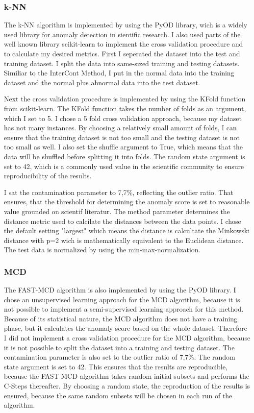 
\subsubsection*{k-NN}
The k-NN algorithm is implemented by using the PyOD library, wich is a widely used library for anomaly detection in sientific research.
I also used parts of the well known library scikit-learn to implement the cross validation procedure and to calculate my desired metrics.
First I seperated the dataset into the test and training dataset.
I split the data into same-sized training and testing datasets.
Similiar to the InterCont Method, I put in the normal data into the training dataset and the normal plus abnormal data into the test dataset.


Next the cross validation procedure is implemented by using the KFold function from scikit-learn.
The KFold function takes the number of folds as an argument, which I set to 5.
I chose a 5 fold cross validation approach, because my dataset has not many instances. 
By choosing a relatively small amount of folds, I can ensure that the training dataset is not too small and the testing dataset is not too small as well.
I also set the shuffle argument to True, which means that the data will be shuffled before splitting it into folds.
The random state argument is set to 42, which is a commonly used value in the scientific community to ensure reproducibility of the results.


I sat the contamination parameter to 7,7\%, reflecting the outlier ratio.
That ensures, that the threshold for determining the anomaly score is set to reasonable value grounded on scientif literatur.
The  method parameter determines the distance metric used to calcilate the distances between the data points.
I chose the default setting "largest" which means the distance is calcultate the Minkowski distance with p=2 wich is mathematically equivalent to the Euclidean distance.
The test data is normalized by using the min-max-normalization.


\subsubsection*{MCD}
The FAST-MCD algorithm is also implemented by using the PyOD library. 
I chose an unsupervised learning approach for the MCD algorithm, because it is not possible to implement a semi-supervised learning approach for this method.
Because of its statistical nature, the MCD algorithm does not have a training phase, but it calculates the anomaly score based on the whole dataset.
Therefore I did not implement a cross validation procedure for the MCD algorithm, because it is not possible to split the dataset into a training and testing dataset.
The contamination parameter is also set to the outlier ratio of 7,7\%.
The random state argument is set to 42. 
This ensures that the results are reproducible, because the FAST-MCD algorithm takes random initial subsets and performs the C-Steps thereafter.
By choosing a random state, the reproduction of the results is ensured, because the same random subsets will be chosen in each run of the algorithm.



